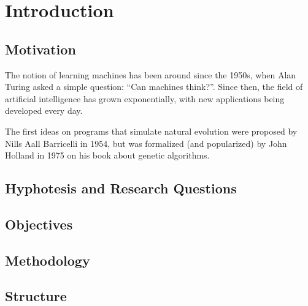 \chapter{Introduction}
\label{chap:introduction}
  \section{Motivation}
  \label{sec:motivation}
    The notion of learning machines has been around since the 1950s, when Alan Turing 
    \autocite{turingCOMPUTINGMACHINERYINTELLIGENCE1950a} asked a simple question: 
    \enquote{Can machines think?}.
    Since then, the field of artificial intelligence has grown exponentially, with new
    applications being developed every day.
    
    The first ideas on programs that simulate natural evolution were proposed by Nills Aall 
    Barricelli \autocite{barricelliNumericalTestingEvolution1962} in 1954, but was formalized (and
    popularized) by John Holland \autocite{hollandAdaptationNaturalArtificial1992a} in 1975 on his
    book about genetic algorithms.

    \blindtext

  \section{Hyphotesis and Research Questions}
  \label{sec:hyphotesis_and_research_questions}
    \Blindtext
  \section{Objectives}
  \label{sec:objectives}
    \Blindtext
  \section{Methodology}
  \label{sec:methodology}
    \Blindtext
  \section{Structure}
  \label{sec:structure}
    \Blindtext